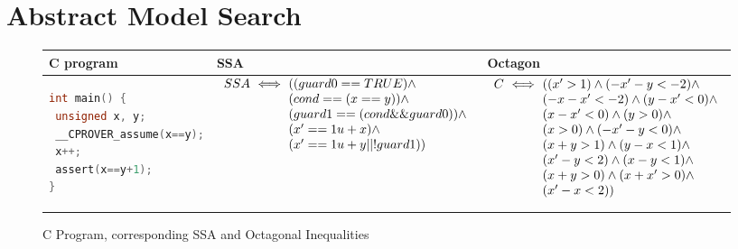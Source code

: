 \section{Abstract Model Search}
%
\begin{figure}[t]
\scriptsize
\begin{tabular}{l|l|l}
\hline
C program & SSA & Octagon \\
\hline
\begin{lstlisting}[mathescape=true,language=C]
int main() {
 unsigned x, y;
 __CPROVER_assume(x==y);
 x++;
 assert(x==y+1);
}
\end{lstlisting}
&
\begin{minipage}{4.40cm}
$\begin{array}{l@{\,\,}c@{\,\,}l}
SSA &\iff& ((guard0 == TRUE) \land \\
    &    & (cond == (x == y)) \land \\
    &    & (guard1 == (cond \&\& guard0)) \land \\
    &    & (x' == 1u + x) \land \\
    &    & (x' == 1u + y || !guard1))
\end{array}$
\end{minipage}
&
\begin{minipage}{3.75cm}
$\begin{array}{l@{\,\,}c@{\,\,}l}
C &\iff& ((x' > 1) \land (-x'-y < -2) \land \\
  &    & (-x-x' < -2) \land (y-x' < 0) \land \\                                                                
  &    & (x-x' < 0) \land (y > 0) \land \\
  &    & (x > 0) \land (-x'-y < 0) \land \\
  &    & (x+y > 1) \land (y-x < 1) \land \\
  &    & (x'-y < 2) \land (x-y < 1) \land \\
  &    & (x+y > 0) \land (x+x' > 0) \land \\
  &    & (x'-x < 2))
\end{array}$
\end{minipage}
\\
\hline
\end{tabular}
\caption{C Program, corresponding SSA and Octagonal Inequalities}
\label{swssa}
\end{figure}
%
%    
